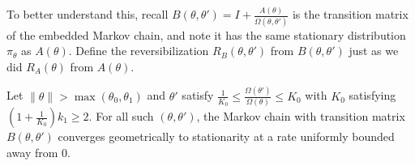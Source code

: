 To better understand this, recall $B(\theta, \theta') = I+\frac{A(\theta)}{\Omega(\theta, \theta')}$
is the transition matrix of the embedded Markov chain, and note 
it has the same stationary distribution $\pi_\theta$ as $A(\theta)$.
Define the reversibilization $R_B(\theta,\theta')$ from $B(\theta,\theta')$ 
just as we did $R_A(\theta)$ from $A(\theta)$. 
\begin{lemma}
  Let $\|\theta\| > \max(\theta_0, \theta_1)$ and $\theta'$ satisfy 
$\frac{1}{K_0} \le \frac{\Omega(\theta')}{\Omega(\theta)} \le K_0 $ 
with $K_0$ %
satisfying $(1 + \frac{1}{K_0})k_1 \ge 2$. 
For all such $(\theta,\theta')$, the Markov chain with transition matrix 
$B(\theta,\theta')$ converges geometrically to stationarity at a rate 
uniformly bounded away from $0$.
  \label{lem:eig_lemma}
\end{lemma}
